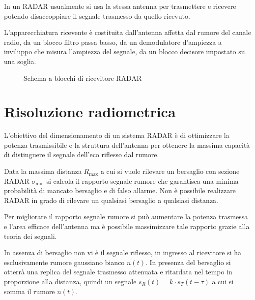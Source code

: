 \begin{nota}In un \ac{RADAR} usualmente si usa la stessa antenna per trasmettere e ricevere potendo disaccoppiare il segnale trasmesso da quello ricevuto.\end{nota}

L'apparecchiatura ricevente è costituita dall'antenna affetta dal rumore del canale radio, da un blocco filtro passa basso, da un demodulatore d'ampiezza a inviluppo che misura l'ampiezza del segnale, da un blocco decisore impostato su una soglia.
\begin{figure}[ht]
\centering
{}
\caption{Schema a blocchi di ricevitore \ac{RADAR}}
\label{fig:ricevitore_radar}
\end{figure}

\section{Risoluzione radiometrica}
L'obiettivo del dimensionamento di un sistema \ac{RADAR} è di ottimizzare la potenza trasmissibile e la struttura dell'antenna per ottenere la massima capacità di distinguere il segnale dell'eco riflesso dal rumore.

Data la massima distanza $R_\text{max}$ a cui si vuole rilevare un bersaglio con sezione \ac{RADAR} $\sigma_\text{min}$ si calcola il rapporto segnale rumore che garantisca una minima probabilità di mancato bersaglio e di falso allarme. Non è possibile realizzare \ac{RADAR} in grado di rilevare un qualsiasi bersaglio a qualsiasi distanza.

Per migliorare il rapporto segnale rumore si può aumentare la potenza trasmessa e l'area efficace dell'antenna ma è possibile massimizzare tale rapporto grazie alla teoria dei segnali.

In assenza di bersaglio non vi è il segnale riflesso, in ingresso al ricevitore si ha esclusivamente rumore gaussiano bianco $n(t)$.
In presenza del bersaglio si otterrà una replica del segnale trasmesso attenuata e ritardata nel tempo in proporzione alla distanza, quindi un segnale $s_R(t)=k\cdot s_T(t-\tau)$ a cui si somma il rumore $n(t)$.

